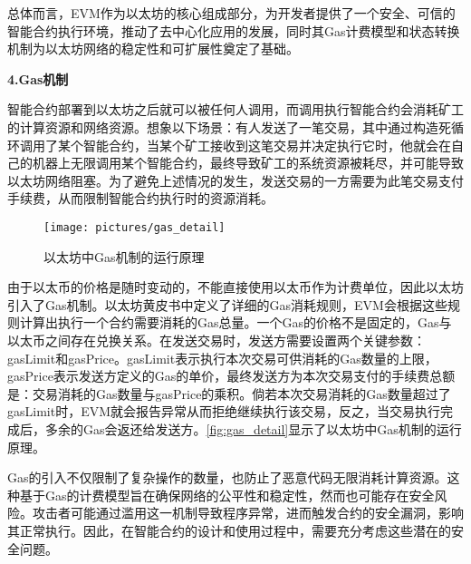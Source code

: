 
总体而言，EVM作为以太坊的核心组成部分，为开发者提供了一个安全、可信的智能合约执行环境，推动了去中心化应用的发展，同时其Gas计费模型和状态转换机制为以太坊网络的稳定性和可扩展性奠定了基础。   
    

\par\textbf{4.Gas机制}
    
智能合约部署到以太坊之后就可以被任何人调用，而调用执行智能合约会消耗矿工的计算资源和网络资源。想象以下场景：有人发送了一笔交易，其中通过构造死循环调用了某个智能合约，当某个矿工接收到这笔交易并决定执行它时，他就会在自己的机器上无限调用某个智能合约，最终导致矿工的系统资源被耗尽，并可能导致以太坊网络阻塞。为了避免上述情况的发生，发送交易的一方需要为此笔交易支付手续费，从而限制智能合约执行时的资源消耗。
\begin{figure}[htbp]
    \centering
    \texttt{[image: pictures/gas\_detail]}
    \caption{\label{fig:gas_detail}以太坊中Gas机制的运行原理}
\end{figure}
由于以太币的价格是随时变动的，不能直接使用以太币作为计费单位，因此以太坊引入了Gas机制。以太坊黄皮书中定义了详细的Gas消耗规则，EVM会根据这些规则计算出执行一个合约需要消耗的Gas总量。一个Gas的价格不是固定的，Gas与以太币之间存在兑换关系\cite{tuliangqiong}。在发送交易时，发送方需要设置两个关键参数：gasLimit和gasPrice。gasLimit表示执行本次交易可供消耗的Gas数量的上限，gasPrice表示发送方定义的Gas的单价，最终发送方为本次交易支付的手续费总额是：交易消耗的Gas数量与gasPrice的乘积。倘若本次交易消耗的Gas数量超过了gasLimit时，EVM就会报告异常从而拒绝继续执行该交易，反之，当交易执行完成后，多余的Gas会返还给发送方。\autoref{fig:gas_detail}显示了以太坊中Gas机制的运行原理。


Gas的引入不仅限制了复杂操作的数量，也防止了恶意代码无限消耗计算资源。这种基于Gas的计费模型旨在确保网络的公平性和稳定性，然而也可能存在安全风险。攻击者可能通过滥用这一机制导致程序异常，进而触发合约的安全漏洞，影响其正常执行。因此，在智能合约的设计和使用过程中，需要充分考虑这些潜在的安全问题。
